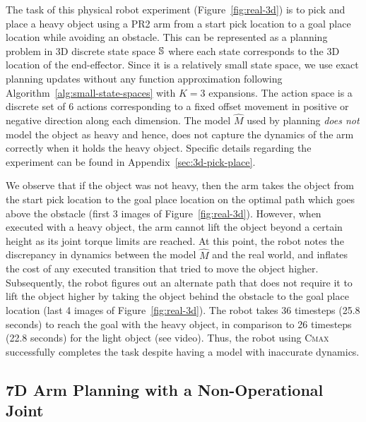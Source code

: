 The task of this physical robot experiment (Figure~\ref{fig:real-3d}) is to pick and place a heavy 
object using a PR2 arm from a start pick location to a goal place
location while avoiding an obstacle. This can be represented as a
planning problem in 3D discrete state space $\mathbb{S}$ where
each state corresponds to the 3D location of the end-effector.
Since it is a
relatively small state space, we use exact planning updates without
any function approximation following
Algorithm~\ref{alg:small-state-spaces} with $K=3$ expansions.
The action space is a
discrete set of $6$ actions corresponding to a fixed offset movement
in positive or negative direction along each dimension.
The
model $\hat{M}$ used by planning \textit{does not} model the object as
heavy and hence, does not capture the dynamics of the arm correctly when it
holds the heavy object. Specific details regarding the experiment can
be found in Appendix~\ref{sec:3d-pick-place}.

We observe that if the object was not heavy, then the arm takes the
object from the start pick location to the goal place location on the
optimal path which goes above the obstacle (first 3 images of
Figure~\ref{fig:real-3d}). However, when executed
with a heavy object, the arm cannot lift the object beyond a certain
height as its joint torque limits are reached. At this point, the robot notes the
discrepancy in dynamics between the model $\hat{M}$ and the real world,
and inflates the cost of any executed transition that tried to move the object
higher. Subsequently, the robot figures out
an alternate path that does not require it to lift the object higher
by taking the object behind the obstacle to the goal place
location (last 4 images of Figure~\ref{fig:real-3d}). The robot takes
36 timesteps (25.8 seconds) to reach
the goal with the heavy object, in comparison to 26 timesteps (22.8 seconds) for the
light object (see video). Thus, the robot using \textsc{Cmax} successfully completes the task despite having a
model with inaccurate dynamics.

\subsection{7D Arm Planning with a Non-Operational Joint}
\label{sec:real-world-7d}

